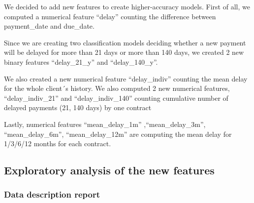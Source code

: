 \documentclass[
]{article}
\begin{document}
We decided to add new features to create higher-accuracy models.
First of all, we computed a numerical feature ``delay'' counting the difference between payment\_date and due\_date.

Since we are creating two classification models deciding whether a new payment will be delayed
for more than 21 days or more than 140 days, we created 2 new binary features ``delay\_21\_y'' and ``delay\_140\_y''.

We also created a new numerical feature ``delay\_indiv'' counting the mean delay for the whole client´s history. We also computed 2 new numerical features, ``delay\_indiv\_21'' and ``delay\_indiv\_140'' counting cumulative number of delayed payments (21, 140 days) by one contract

Lastly, numerical features ``mean\_delay\_1m'' ,``mean\_delay\_3m'', ``mean\_delay\_6m'', ``mean\_delay\_12m'' are computing the mean delay for 1/3/6/12 months for each contract.

\hypertarget{exploratory-analysis-of-the-new-features}{%
\subsection{Exploratory analysis of the new features}\label{exploratory-analysis-of-the-new-features}}

\hypertarget{data-description-report-1}{%
\subsubsection{Data description report}\label{data-description-report-1}}
\end{document}
